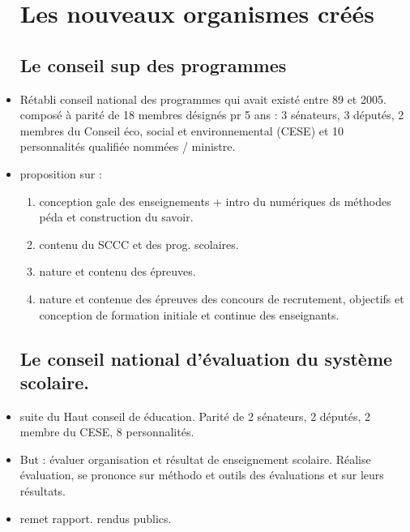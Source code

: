 \documentclass[12pt]{report}
\begin{document}
\begin{itemize}
\section{Les nouveaux organismes créés}

\subsection{Le conseil sup des programmes}

\item Rétabli conseil national des programmes qui avait existé entre 89 et 2005. composé à parité de 18 membres désignés pr 5 ans : 3 sénateurs, 3 députés, 2 membres du Conseil éco, social et environnemental (CESE) et 10 personnalités qualifiée nommées / ministre. \\

\item proposition sur : 
\begin{enumerate}
\item conception gale des enseignements + intro du numériques ds méthodes péda et construction du savoir. \\
\item contenu du SCCC et des prog. scolaires. \\
\item nature et contenu des épreuves. \\
\item nature et contenue des épreuves des concours de recrutement, objectifs et conception de formation initiale et continue des enseignants. \\
\end{enumerate}

\subsection{Le conseil national d'évaluation du système scolaire.}

\item suite du Haut conseil de éducation. Parité de 2 sénateurs, 2 députés, 2 membre du CESE, 8 personnalités.\\

\item But : évaluer organisation et résultat de enseignement scolaire. Réalise évaluation, se prononce sur méthodo et outils des évaluations et sur leurs résultats. \\

\item remet rapport. rendus publics. \\


\end{itemize}
\end{document}
